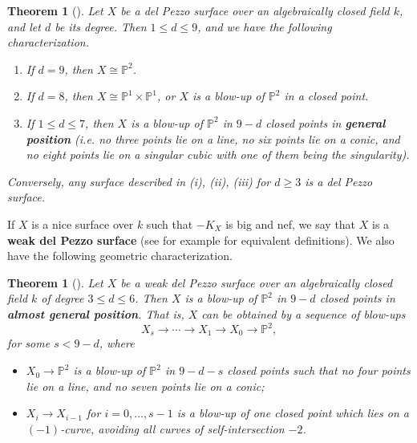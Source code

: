 \documentclass[a4paper, 11pt, reqno]{amsart}
\numberwithin{equation}{section} \numberwithin{figure}{section}
\newcommand{\term}[1]{\textbf{#1}}          %
\def \P {{\mathbb P}}
\newcommand{\ra}{\rightarrow}
\newtheorem{theorem}[lemma]{Theorem}
\theoremstyle{definition}
\numberwithin{lemma}{section}
\begin{document}
\begin{theorem}[{\cite[Theorem 24.3, Theorem 24.4, Remark 26.3]{manin}}]\label{thm:delpezzoclassification}
    Let $X$ be a del Pezzo surface over an algebraically closed field $k$, and let $d$ be its degree. Then $1 \leq d \leq 9$, and we have the following characterization.
    \begin{enumerate}
        \item[(i)] If $d = 9$, then $X \cong \P^2$.
        \item[(ii)] If $d = 8$, then $X \cong \P^1 \times \P^1$, or $X$ is a blow-up of $\P^2$ in a closed point.
        \item[(iii)] If $1 \leq d \leq 7$, then $X$ is a blow-up of $\P^2$ in $9-d$ closed points in \term{general position} (i.e. no three points lie on a line, no six points lie on a conic, and no eight points lie on a singular cubic with one of them being the singularity).
    \end{enumerate}
    Conversely, any surface described in (i), (ii), (iii) for $d \geq 3$ is a del Pezzo surface.
\end{theorem}

If $X$ is a nice surface over $k$ such that $-K_X$ is big and nef, we say that $X$ is a \term{weak del Pezzo surface} (see for example \cite[Th\'{e}or\`{e}me 1]{demazure} for equivalent definitions). We also have the following geometric characterization.

\begin{theorem}[{\cite[Corollary 8.1.17]{dolgachev}}]\label{thm:weakdelpezzoclassification}
    Let $X$ be a weak del Pezzo surface over an algebraically closed field $k$ of degree $3 \leq d \leq 6$. Then $X$ is a blow-up of $\P^2$ in $9-d$ closed points in \term{almost general position}. That is, $X$ can be obtained by a sequence of blow-ups
    \[X_s \ra \cdots \ra X_1 \ra X_0 \ra \P^2,\]
    for some $s < 9-d$, where
    \begin{itemize}
        \item $X_0 \ra \P^2$ is a blow-up of $\P^2$ in $9-d-s$ closed points such that no four points lie on a line, and no seven points lie on a conic;
        \item $X_i \ra X_{i-1}$ for $i = 0, \ldots, s-1$ is a blow-up of one closed point which lies on a $(-1)$-curve, avoiding all curves of self-intersection $-2$.
    \end{itemize}
\end{theorem}
\end{document}
